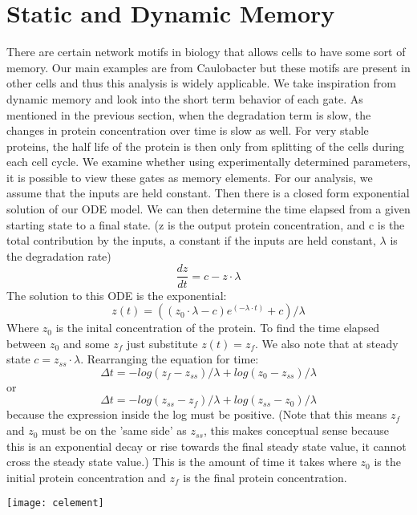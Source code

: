 \documentclass{article}
\begin{document}
\section{Static and Dynamic Memory}
There are certain network motifs in biology that allows cells to have some sort of memory.  Our main examples are from Caulobacter but these motifs are present in other cells and thus this analysis is widely applicable.  
We take inspiration from dynamic memory and look into the short term behavior of each gate.  As mentioned in the previous section, when the degradation term is slow, the changes in protein concentration over time is slow as well.  For very stable proteins, the half life of the protein is then only from splitting of the cells during each cell cycle.  We examine whether using experimentally determined parameters, it is possible to view these gates as memory elements.  For our analysis, we assume that the inputs are held constant.  Then there is a closed form exponential solution of our ODE model.  We can then determine the time elapsed from a given starting state to a final state.  (z is the output protein concentration, and c is the total contribution by the inputs, a constant if the inputs are held constant, $\lambda$ is the degradation rate)
\[\frac{dz}{dt}=c-z\cdot\lambda
\]
The solution to this ODE is the exponential:
\[z(t)=((z_0\cdot\lambda-c)e^{(-\lambda\cdot t)}+c)/\lambda
\]
Where $z_0$ is the inital concentration of the protein.  To find the time elapsed between $z_0$ and some $z_f$ just substitute $z(t)=z_f$.  We also note that at steady state $c=z_{ss}\cdot\lambda$.  Rearranging the equation for time:
\[\Delta t= -log(z_f-z_{ss})/ \lambda+ log(z_0-z_{ss})/ \lambda
\]
or
\[\Delta t= -log(z_{ss}-z_f)/ \lambda+ log(z_{ss}-z_0)/ \lambda
\]
because the expression inside the log must be positive.  (Note that this means $z_f$ and $z_0$ must be on the 'same side' as $z_{ss}$, this makes conceptual sense because this is an exponential decay or rise towards the final steady state value, it cannot cross the steady state value.)
 This is the amount of time it takes where $z_0$ is the initial protein concentration and $z_f$ is the final protein concentration.
\newline
\begin{center}
\texttt{[image: celement]}
\end{center}
\end{document}
